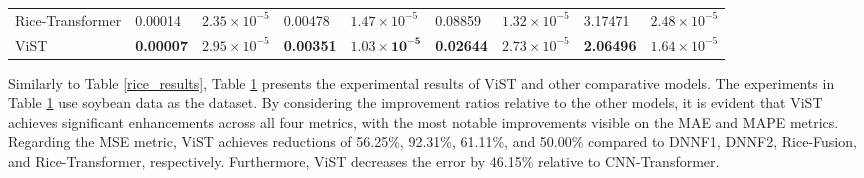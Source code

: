 \documentclass[acmsmall,manuscript, screen, review]{acmart}
\begin{document}
\begin{table}[htbp]
\begin{tabular}{lllllllll}
    Rice-Transformer & 0.00014 & \begin{math}2.35\times 10^{-5}\end{math} & 0.00478 & \begin{math}1.47\times 10^{-5}\end{math} & 0.08859 & \begin{math}1.32\times 10^{-5}\end{math} & 3.17471 & \begin{math}2.48\times 10^{-5}\end{math} \\
    ViST  & \textbf{0.00007} & \begin{math}2.95\times 10^{-5}\end{math} & \textbf{0.00351} & \begin{math}\mathbf{1.03\times 10^{-5}}\end{math} & \textbf{0.02644} & \begin{math}2.73\times 10^{-5}\end{math} & \textbf{2.06496} & \begin{math}1.64\times 10^{-5}\end{math} \\
    \bottomrule
    \end{tabular}%
    \label{soybean_results}%
\end{table}%


Similarly to Table \ref{rice_results}, Table \ref{soybean_results} presents the experimental results of ViST and other comparative models. The experiments in Table \ref{soybean_results} use soybean data as the dataset. By considering the improvement ratios relative to the other models, it is evident that ViST achieves significant enhancements across all four metrics, with the most notable improvements visible on the MAE and MAPE metrics. Regarding the MSE metric, ViST achieves reductions of 56.25\%, 92.31\%, 61.11\%, and 50.00\% compared to DNNF1, DNNF2, Rice-Fusion, and Rice-Transformer, respectively. Furthermore, ViST decreases the error by 46.15\% relative to CNN-Transformer.
\end{document}
